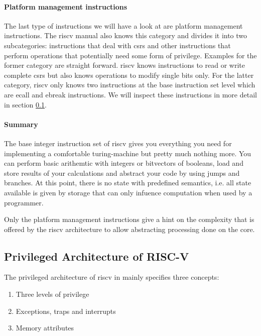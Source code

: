 \paragraph{Platform management instructions}
The last type of instructions we will have a look at are platform management instructions.
The \gls{riscv} manual also knows this category and divides it into two subcategories: instructions that deal with \glspl{csr} and other instructions that perform operations that potentially need some form of privilege.
Examples for the former category are straight forward.
\gls{riscv} knows instructions to read or write complete \glspl{csr} but also knows operations to modify single bits only.
For the latter category, \gls{riscv} only knows two instructions at the base instruction set level which are \gls{ecall} and \gls{ebreak} instructions.
We will inspect these instructions in more detail in section \ref{sec:rv-priv-arch}.

\paragraph{Summary}
The base integer instruction set of \gls{riscv} gives you everything you need for implementing a comfortable turing-machine but pretty much nothing more.
You can perform basic arithemtic with integers or bitvectors of booleans, load and store results of your calculations and abstract your code by using jumps and branches.
At this point, there is no state with predefined semantics, i.e. all state available is given by storage that can only infuence computation when used by a programmer.

Only the platform management instructions give a hint on the complexity that is offered by the \gls{riscv} architecture to allow abstracting processing done on the core.

\subsection{Privileged Architecture of RISC-V}
\label{sec:rv-priv-arch}

The privileged architecture of \gls{riscv} in \cite{RiscVISAP} mainly specifies three concepts:
\begin{enumerate}
    \item Three levels of privilege
    \item Exceptions, traps and interrupts
    \item Memory attributes
\end{enumerate}

